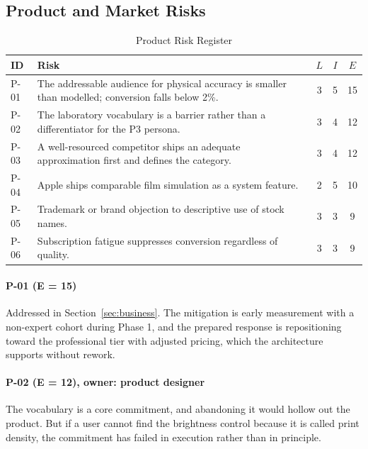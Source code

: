 \subsection{Product and Market Risks}

\begin{table}[htbp]
\caption{Product Risk Register}
\label{tab:prodrisk}
\begin{center}
\renewcommand{\arraystretch}{1.15}
\begin{tabularx}{\columnwidth}{@{}l>{\raggedright\arraybackslash}Xccc@{}}
\toprule
\textbf{ID} & \textbf{Risk} & $L$ & $I$ & $E$ \\
\midrule
P-01 & The addressable audience for physical accuracy is smaller than modelled; conversion falls below 2\%. & 3 & 5 & 15 \\
P-02 & The laboratory vocabulary is a barrier rather than a differentiator for the P3 persona. & 3 & 4 & 12 \\
P-03 & A well-resourced competitor ships an adequate approximation first and defines the category. & 3 & 4 & 12 \\
P-04 & Apple ships comparable film simulation as a system feature. & 2 & 5 & 10 \\
P-05 & Trademark or brand objection to descriptive use of stock names. & 3 & 3 & 9 \\
P-06 & Subscription fatigue suppresses conversion regardless of quality. & 3 & 3 & 9 \\
\bottomrule
\end{tabularx}
\end{center}
\end{table}

\paragraph{P-01 (E = 15)}
Addressed in Section~\ref{sec:business}. The mitigation is early measurement
with a non-expert cohort during Phase 1, and the prepared response is
repositioning toward the professional tier with adjusted pricing, which the
architecture supports without rework.

\paragraph{P-02 (E = 12), owner: product designer}
The vocabulary is a core commitment, and abandoning it would hollow out the
product. But if a user cannot find the brightness control because it is called
print density, the commitment has failed in execution rather than in principle.

